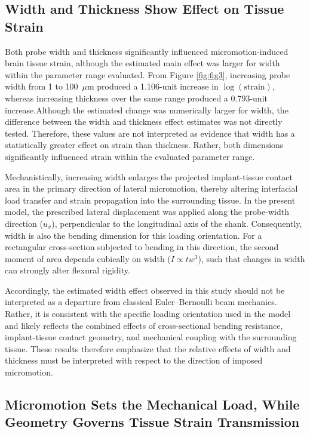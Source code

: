 \documentclass[fleqn,10pt]{wlscirep}
\begin{document}
\subsection{Width and Thickness Show  Effect on Tissue Strain}

{Both probe width and thickness significantly influenced micromotion-induced brain tissue strain, although the estimated main effect was larger for width within the parameter range evaluated.} From Figure \ref{fig:fig3}, increasing probe width from 1 to 100~$\mu$m produced a 1.106-unit increase in $\log(\mathrm{strain})$, whereas increasing thickness over the same range produced a 0.793-unit increase.Although the estimated change was numerically larger for width, the difference between the width and thickness effect estimates was not directly tested. Therefore, these values are not interpreted as evidence that width has a statistically greater effect on strain than thickness. Rather, both dimensions significantly influenced strain within the evaluated parameter range. 

Mechanistically, increasing width enlarges the projected implant-tissue contact area in the primary direction of lateral micromotion, thereby altering interfacial load transfer and strain propagation into the surrounding tissue. In the present model, the prescribed lateral displacement was applied along the probe-width direction ($u_x$), perpendicular to the longitudinal axis of the shank. Consequently, width is also the bending dimension for this loading orientation. For a rectangular cross-section subjected to bending in this direction, the second moment of area depends cubically on width ($I \propto t w^3$), such that changes in width can strongly alter flexural rigidity.

Accordingly, the  estimated width effect observed in this study should not be interpreted as a departure from classical Euler--Bernoulli beam mechanics. Rather, it is consistent with the specific loading orientation used in the model and likely reflects the combined effects of cross-sectional bending resistance, implant-tissue contact geometry, and mechanical coupling with the surrounding tissue. These results therefore emphasize that the relative effects of width and thickness must be interpreted with respect to the direction of imposed micromotion.

\subsection{Micromotion Sets the Mechanical Load, While Geometry Governs Tissue Strain Transmission}
\end{document}
